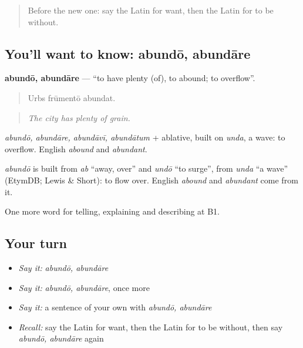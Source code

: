 \label{lesson:LA-C422-abundo}



\begin{quote}
Before the new one: say the Latin for want, then the Latin for to be without.
\end{quote}

\subsection*{You'll want to know: abundō, abundāre}
\textbf{abundō, abundāre} — \textquotedblleft{}to have plenty (of), to abound; to overflow\textquotedblright{}.

\begin{quote}
Urbs frūmentō abundat.
\end{quote}

\begin{quote}
\emph{The city has plenty of grain.}
\end{quote}

\emph{abundō, abundāre, abundāvī, abundātum} + ablative, built on \emph{unda}, a wave: to overflow. English \emph{abound} and \emph{abundant}.

\begin{cousinweb}
\emph{abundō} is built from \emph{ab} \textquotedblleft{}away, over\textquotedblright{} and \emph{undō} \textquotedblleft{}to surge\textquotedblright{}, from \emph{unda} \textquotedblleft{}a wave\textquotedblright{} (EtymDB; Lewis \& Short): to flow over. English \emph{abound} and \emph{abundant} come from it.
\end{cousinweb}

\begin{grammarlens}[title={What you've built}]
One more word for telling, explaining and describing at B1.
\end{grammarlens}

\subsection*{Your turn}
\begin{itemize}
\raggedright
  \item \emph{Say it:} \emph{abundō, abundāre}
  \item \emph{Say it:} \emph{abundō, abundāre}, once more
  \item \emph{Say it:} a sentence of your own with \emph{abundō, abundāre}
  \item \emph{Recall:} say the Latin for want, then the Latin for to be without, then say \emph{abundō, abundāre} again
\end{itemize}

